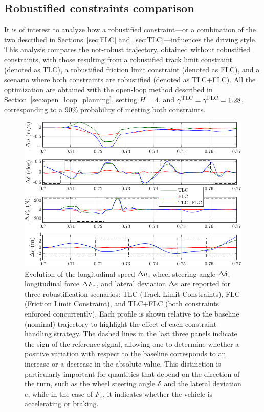 \subsection{Robustified constraints comparison}
It is of interest to analyze how a robustified constraint---or a combination of the two described in Sections~\ref{sec:FLC} and~\ref{sec:TLC}---influences the driving style. This analysis compares the not-robust trajectory, obtained without robustified constraints, with those resulting from a robustified track limit constraint (denoted as TLC), a robustified friction limit constraint (denoted as FLC), and a scenario where both constraints are robustified (denoted as TLC+FLC). All the optimization are obtained with the open-loop method described in Section~\ref{sec:open_loop_planning}, setting $H=4$, and $\gamma^\textrm{TLC}=\gamma^\textrm{FLC}=1.28$, corresponding to a 90\% probability of meeting both constraints. 

\begin{figure}
	\centering
	\includegraphics{Fig/ol_telemetries.pdf}
	\caption{Evolution of the longitudinal speed $\Delta u$, wheel steering angle $\Delta \delta$, longitudinal force $\Delta F_x$, and lateral deviation $\Delta e$ are reported for three robustification scenarios: TLC (Track Limit Constraints), FLC (Friction Limit Constraint), and TLC+FLC (both constraints enforced concurrently). Each profile is shown relative to the baseline (nominal) trajectory to highlight the effect of each constraint-handling strategy. The dashed lines in the last three panels indicate the sign of the reference signal, allowing one to determine whether a positive variation with respect to the baseline corresponds to an increase or a decrease in the absolute value. This distinction is particularly important for quantities that depend on the direction of the turn, such as the wheel steering angle $\delta$ and the lateral deviation $e$, while in the case of $F_x$, it indicates whether the vehicle is accelerating or braking.}
	\label{fig:ol_telemetries}
\end{figure}

